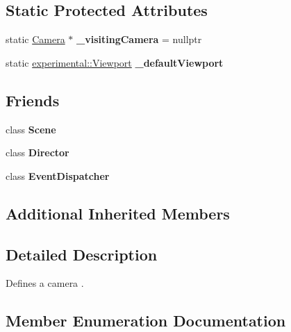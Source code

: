 \subsection*{Static Protected Attributes}
\begin{DoxyCompactItemize}
\item 
\mbox{\label{classCamera_ae4a1fe717533fa3952496f01d4dff27e}} 
static \hyperlink{classCamera}{Camera} $\ast$ {\bfseries \+\_\+visiting\+Camera} = nullptr
\item 
\mbox{\label{classCamera_acb05e19da13f4c17520b4faf78ccb1c8}} 
static \hyperlink{structexperimental_1_1Viewport}{experimental\+::\+Viewport} {\bfseries \+\_\+default\+Viewport}
\end{DoxyCompactItemize}
\subsection*{Friends}
\begin{DoxyCompactItemize}
\item 
\mbox{\label{classCamera_acf721625ddb3197a5be044f6d5600600}} 
class {\bfseries Scene}
\item 
\mbox{\label{classCamera_a96e0e845c153610f2a2f0ad3238a2511}} 
class {\bfseries Director}
\item 
\mbox{\label{classCamera_a7de0ed02fc316d9e73b7eb3def69c105}} 
class {\bfseries Event\+Dispatcher}
\end{DoxyCompactItemize}
\subsection*{Additional Inherited Members}


\subsection{Detailed Description}
Defines a camera . 

\subsection{Member Enumeration Documentation}
\mbox{\label{classCamera_a3b0a1f58deca679ac665f61c480d1dcb}} 
